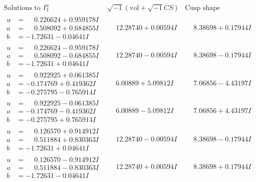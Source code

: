 \documentclass[1p]{elsarticle_modified}
\theoremstyle{definition}
\newcommand{\I}{\sqrt{-1}}
\begin{document}
$$\begin{array}{c|c|c}  
\text{Solutions to }I^u_{3}& \I (\text{vol} + \sqrt{-1}CS) & \text{Cusp shape}\\
 \hline 
\begin{aligned}
u &= \phantom{-}0.226624 + 0.959178 I \\
a &= \phantom{-}0.508092 + 0.684855 I \\
b &= -1.72631 - 0.04641 I\end{aligned}
 & \phantom{-}12.28740 + 0.00594 I & \phantom{-}8.38698 + 0.17944 I \\ \hline\begin{aligned}
u &= \phantom{-}0.226624 - 0.959178 I \\
a &= \phantom{-}0.508092 - 0.684855 I \\
b &= -1.72631 + 0.04641 I\end{aligned}
 & \phantom{-}12.28740 - 0.00594 I & \phantom{-}8.38698 - 0.17944 I \\ \hline\begin{aligned}
u &= \phantom{-}0.922925 + 0.061385 I \\
a &= -0.174769 + 0.419362 I \\
b &= -0.275795 - 0.765914 I\end{aligned}
 & \phantom{-}6.00889 + 5.09812 I & \phantom{-}7.06856 - 4.43197 I \\ \hline\begin{aligned}
u &= \phantom{-}0.922925 - 0.061385 I \\
a &= -0.174769 - 0.419362 I \\
b &= -0.275795 + 0.765914 I\end{aligned}
 & \phantom{-}6.00889 - 5.09812 I & \phantom{-}7.06856 + 4.43197 I \\ \hline\begin{aligned}
u &= \phantom{-}0.126570 + 0.914912 I \\
a &= \phantom{-}0.511884 + 0.830363 I \\
b &= -1.72631 + 0.04641 I\end{aligned}
 & \phantom{-}12.28740 - 0.00594 I & \phantom{-}8.38698 - 0.17944 I \\ \hline\begin{aligned}
u &= \phantom{-}0.126570 - 0.914912 I \\
a &= \phantom{-}0.511884 - 0.830363 I \\
b &= -1.72631 - 0.04641 I\end{aligned}
 & \phantom{-}12.28740 + 0.00594 I & \phantom{-}8.38698 + 0.17944 I \\ \hline\begin{aligned}

\end{aligned}
\end{array}$$
\end{document}
